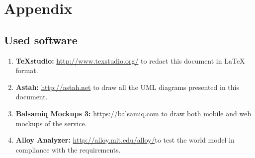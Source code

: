 \documentclass[english]{article}
\newcounter{requirement}
\begin{document}
\newpage{}









\pagebreak


\pagebreak

\section{Appendix}

\subsection{Used software}
\begin{enumerate}
	\item \textbf{TeXstudio:} \url{http://www.texstudio.org/} to redact this document in {\LaTeX} format.
	\item \textbf{Astah:} \url{http://astah.net} to draw all the UML diagrams presented in this document.
	\item \textbf{Balsamiq Mockups 3:} \url{https://balsamiq.com} to draw both mobile and web mockups of the service.
	\item \textbf{Alloy Analyzer:}  \url{http://alloy.mit.edu/alloy/}to test the world model in compliance with the requirements.
\end{enumerate}
\end{document}

